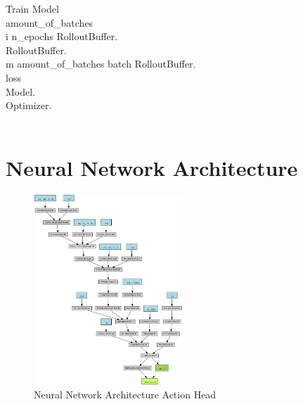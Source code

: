 \renewcommand{\thepseudonum}{\roman{pseudonum}}
\begin{pseudocode}{Train Model}{ }
\\

amount\_of\_batches \GETS {}\\
\FOR i  \TO n\_epochs \DO
\BEGIN
RolloutBuffer.\\
RolloutBuffer.\\
\FOR m  \TO amount\_of\_batches \DO
\BEGIN
batch \GETS RolloutBuffer.\\
loss \GETS {}\\
Model.\\
Optimizer.\\
\END\\
\END
\ENDPROCEDURE
\label{pseudocode:train_model}
\end{pseudocode}

\section{Neural Network Architecture}

\begin{figure}
    \centering
    \includegraphics[width=0.5\textwidth]{Bilder/action_graph.png}
    \caption{Neural Network Architecture Action Head}
    \label{fig:action_graph}
\end{figure}


